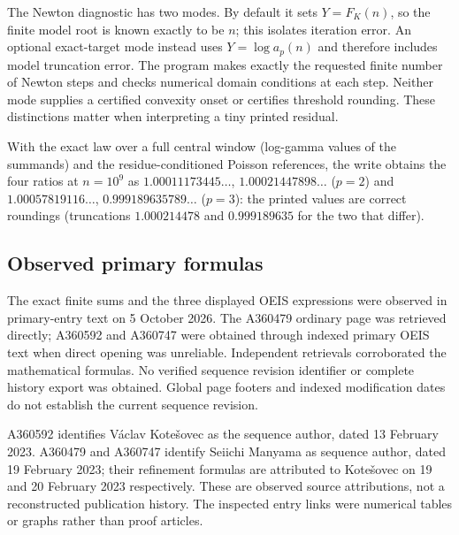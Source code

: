 The Newton diagnostic has two modes. By default it sets $Y=F_K(n)$, so the
finite model root is known exactly to be $n$; this isolates iteration error.
An optional exact-target mode instead uses $Y=\log a_p(n)$ and therefore
includes model truncation error. The program makes exactly the requested
finite number of Newton steps and checks numerical domain conditions at
each step. Neither mode supplies a certified convexity onset or certifies
threshold rounding. These distinctions matter when interpreting a tiny
printed residual.
\begin{writenote}
With the exact law over a full central window (log-gamma values of the
summands) and the residue-conditioned Poisson references, the write obtains
the four ratios at $n=10^9$ as $1.00011173445\ldots$, $1.00021447898\ldots$
($p=2$) and $1.00057819116\ldots$, $0.999189635789\ldots$ ($p=3$): the printed
values are correct roundings (truncations $1.000214478$ and $0.999189635$ for
the two that differ).
\end{writenote}

\subsection{Observed primary formulas}
\label{spb:ep:sec:sources}
The exact finite sums and the three displayed OEIS expressions were
observed in primary-entry text on 5 October 2026.
The A360479 ordinary page was retrieved directly; A360592 and A360747
were obtained through indexed primary OEIS text when direct opening was
unreliable. Independent retrievals corroborated the mathematical formulas.
No verified sequence revision identifier or complete history export was
obtained. Global page footers and indexed modification dates do not
establish the current sequence revision.

A360592 identifies V\'aclav Kote\v{s}ovec as the sequence author, dated
13 February 2023. A360479 and A360747 identify Seiichi Manyama as sequence
author, dated 19 February 2023; their refinement formulas are attributed
to Kote\v{s}ovec on 19 and 20 February 2023 respectively.
These are observed source attributions, not a reconstructed publication
history. The inspected entry links were numerical tables or graphs rather
than proof articles.

